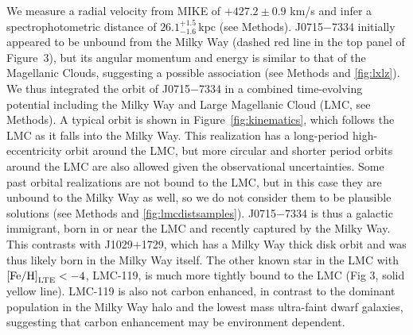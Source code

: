 \documentclass{natureprintstyle}
\newcommand{\umpstar}{J0715$-$7334\xspace}
\newcommand{\caffaustar}{J1029$+$1729\xspace}
\begin{document}
We measure a radial velocity from MIKE of $+427.2 \pm 0.9$ km/s and infer a spectrophotometric distance of $26.1^{+1.5}_{-1.6}$\,kpc (see Methods). 
\umpstar initially appeared to be unbound from the Milky Way (dashed red line in the top panel of Figure~3), but its angular momentum and energy is similar to that of the Magellanic Clouds, suggesting a possible association (see Methods and \ref{fig:lxlz}). 
We thus integrated the orbit of \umpstar in a combined time-evolving potential including the Milky Way and Large Magellanic Cloud (LMC, see Methods). 
A typical orbit is shown in Figure~\ref{fig:kinematics}, which follows the LMC as it falls into the Milky Way. 
This realization has a long-period high-eccentricity orbit around the LMC, but more circular and shorter period orbits around the LMC are also allowed given the observational uncertainties.
Some past orbital realizations are not bound to the LMC, but in this case they are unbound to the Milky Way as well, so we do not consider them to be plausible solutions (see Methods and \ref{fig:lmcdistsamples}). 
\umpstar is thus a galactic immigrant, born in or near the LMC and recently captured by the Milky Way. 
This contrasts with \caffaustar, which has a Milky Way thick disk orbit\cite{Sestito2019,Caffau2024} and was thus likely born in the Milky Way itself. 
The other known star in the LMC with $\mbox{[Fe/H]}_{\rm LTE}<-4$, LMC-119\cite{Chiti2024}, is much more tightly bound to the LMC (Fig 3, solid yellow line). 
LMC-119 is also not carbon enhanced, in contrast to the dominant population in the Milky Way halo\cite{Christlieb2002,Frebel2005,Frebel2015} and the lowest mass ultra-faint dwarf galaxies\cite{Ji2020,Chiti2025}, suggesting that carbon enhancement may be environment dependent\cite{Chiti2024}.
\end{document}
